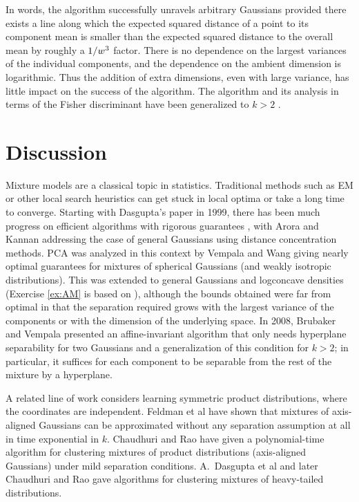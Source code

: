 \documentclass{book}
\numberwithin{exercise}{chapter}
\begin{document}
{In words, the algorithm successfully unravels arbitrary Gaussians
provided there exists a line along which the expected squared distance of a point to its
component mean is smaller than the expected squared distance to the
overall mean by roughly a $1/w^3$ factor. There is no
dependence on the largest variances of the individual components, and
the dependence on the ambient dimension is logarithmic.  Thus
the addition of extra dimensions, even with large variance, has little impact
on the success of the algorithm. The algorithm and its analysis in terms of the Fisher discriminant have been generalized to $k >2$ \cite{Brubaker2008}.
}

\section{Discussion}
Mixture models are a classical topic in statistics. Traditional methods such as EM or other local search heuristics can get stuck in local optima or take a long time to converge. Starting with Dasgupta's paper \cite{Dasgupta1999} in 1999, there has been much progress on efficient algorithms with rigorous guarantees \cite{Arora2005,Dasgupta2000}, with Arora and Kannan \cite{Arora2005}  addressing the case of general Gaussians using distance concentration methods. PCA was analyzed in this context by Vempala and Wang \cite{Vempala2004} giving nearly optimal guarantees for mixtures of spherical Gaussians (and weakly isotropic distributions). This was extended to general Gaussians and logconcave densities \cite{Kannan2008,Achlioptas2005} (Exercise \ref{ex:AM} is based on \cite{Achlioptas2005}), although the bounds obtained were far from optimal in that the separation required grows with the largest variance of the components or with the dimension of the underlying space. In 2008, Brubaker and Vempala \cite{Brubaker2008} presented an affine-invariant algorithm that only needs hyperplane separability for two Gaussians and a generalization of this condition for $k > 2$; in particular, it suffices for each component to be separable from the rest of the mixture by a hyperplane.

A related line of work considers learning symmetric product
distributions, where the coordinates are independent.  Feldman et al
\cite{Feldman2006} have shown that mixtures of axis-aligned Gaussians
can be approximated without any separation assumption at all in time
exponential in $k$.  Chaudhuri and
Rao \cite{Chaudhuri2008a} have given a polynomial-time
algorithm for clustering mixtures of product distributions (axis-aligned Gaussians) under mild separation conditions. A.~Dasgupta et al \cite{Dasgupta2005} and later Chaudhuri and Rao \cite{Chaudhuri2008b} gave algorithms for clustering mixtures of
heavy-tailed distributions.
\end{document}
